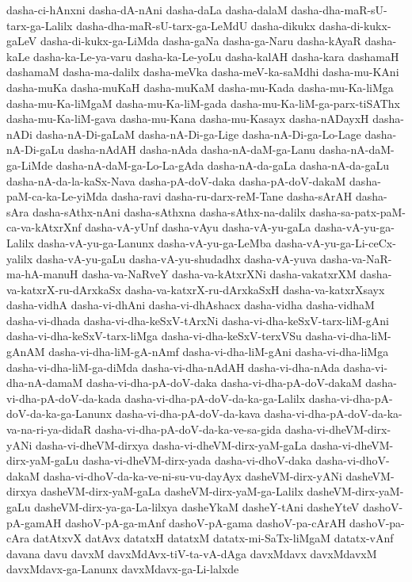 {dasha-ci-hAnxni
dasha-dA-nAni
dasha-daLa
dasha-dalaM
dasha-dha-maR-sU-tarx-ga-Lalilx
dasha-dha-maR-sU-tarx-ga-LeMdU
dasha-dikukx
dasha-di-kukx-gaLeV
dasha-di-kukx-ga-LiMda
dasha-gaNa
dasha-ga-Naru
dasha-kAyaR
dasha-kaLe
dasha-ka-Le-ya-varu
dasha-ka-Le-yoLu
dasha-kalAH
dasha-kara
dashamaH
dashamaM
dasha-ma-dalilx
dasha-meVka
dasha-meV-ka-saMdhi
dasha-mu-KAni
dasha-muKa
dasha-muKaH
dasha-muKaM
dasha-mu-Kada
dasha-mu-Ka-liMga
dasha-mu-Ka-liMgaM
dasha-mu-Ka-liM-gada
dasha-mu-Ka-liM-ga-parx-tiSAThx
dasha-mu-Ka-liM-gava
dasha-mu-Kana
dasha-mu-Kasayx
dasha-nADayxH
dasha-nADi
dasha-nA-Di-gaLaM
dasha-nA-Di-ga-Lige
dasha-nA-Di-ga-Lo-Lage
dasha-nA-Di-gaLu
dasha-nAdAH
dasha-nAda
dasha-nA-daM-ga-Lanu
dasha-nA-daM-ga-LiMde
dasha-nA-daM-ga-Lo-La-gAda
dasha-nA-da-gaLa
dasha-nA-da-gaLu
dasha-nA-da-la-kaSx-Nava
dasha-pA-doV-daka
dasha-pA-doV-dakaM
dasha-paM-ca-ka-Le-yiMda
dasha-ravi
dasha-ru-darx-reM-Tane
dasha-sArAH
dasha-sAra
dasha-sAthx-nAni
dasha-sAthxna
dasha-sAthx-na-dalilx
dasha-sa-patx-paM-ca-va-kAtxrXnf
dasha-vA-yUnf
dasha-vAyu
dasha-vA-yu-gaLa
dasha-vA-yu-ga-Lalilx
dasha-vA-yu-ga-Lanunx
dasha-vA-yu-ga-LeMba
dasha-vA-yu-ga-Li-ceCx-yalilx
dasha-vA-yu-gaLu
dasha-vA-yu-shudadhx
dasha-vA-yuva
dasha-va-NaR-ma-hA-manuH
dasha-va-NaRveY
dasha-va-kAtxrXNi
dasha-vakatxrXM
dasha-va-katxrX-ru-dArxkaSx
dasha-va-katxrX-ru-dArxkaSxH
dasha-va-katxrXsayx
dasha-vidhA
dasha-vi-dhAni
dasha-vi-dhAshacx
dasha-vidha
dasha-vidhaM
dasha-vi-dhada
dasha-vi-dha-keSxV-tArxNi
dasha-vi-dha-keSxV-tarx-liM-gAni
dasha-vi-dha-keSxV-tarx-liMga
dasha-vi-dha-keSxV-terxVSu
dasha-vi-dha-liM-gAnAM
dasha-vi-dha-liM-gA-nAmf
dasha-vi-dha-liM-gAni
dasha-vi-dha-liMga
dasha-vi-dha-liM-ga-diMda
dasha-vi-dha-nAdAH
dasha-vi-dha-nAda
dasha-vi-dha-nA-damaM
dasha-vi-dha-pA-doV-daka
dasha-vi-dha-pA-doV-dakaM
dasha-vi-dha-pA-doV-da-kada
dasha-vi-dha-pA-doV-da-ka-ga-Lalilx
dasha-vi-dha-pA-doV-da-ka-ga-Lanunx
dasha-vi-dha-pA-doV-da-kava
dasha-vi-dha-pA-doV-da-ka-va-na-ri-ya-didaR
dasha-vi-dha-pA-doV-da-ka-ve-sa-gida
dasha-vi-dheVM-dirx-yANi
dasha-vi-dheVM-dirxya
dasha-vi-dheVM-dirx-yaM-gaLa
dasha-vi-dheVM-dirx-yaM-gaLu
dasha-vi-dheVM-dirx-yada
dasha-vi-dhoV-daka
dasha-vi-dhoV-dakaM
dasha-vi-dhoV-da-ka-ve-ni-su-vu-dayAyx
dasheVM-dirx-yANi
dasheVM-dirxya
dasheVM-dirx-yaM-gaLa
dasheVM-dirx-yaM-ga-Lalilx
dasheVM-dirx-yaM-gaLu
dasheVM-dirx-ya-ga-La-lilxya
dasheYkaM
dasheY-tAni
dasheYteV
dashoV-pA-gamAH
dashoV-pA-ga-mAnf
dashoV-pA-gama
dashoV-pa-cArAH
dashoV-pa-cAra
datAtxvX
datAvx
datatxH
datatxM
datatx-mi-SaTx-liMgaM
datatx-vAnf
davana
davu
davxM
davxMdAvx-tiV-ta-vA-dAga
davxMdavx
davxMdavxM
davxMdavx-ga-Lanunx
davxMdavx-ga-Li-lalxde
}
